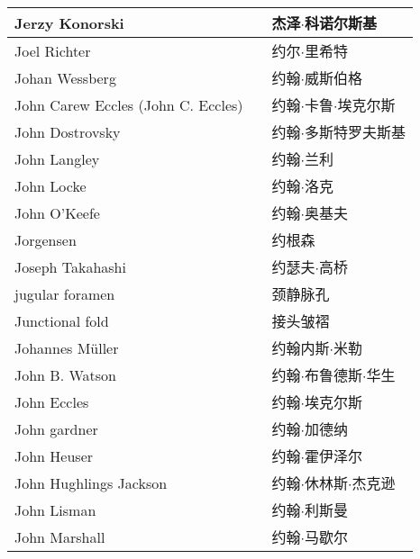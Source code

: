\begin{longtable}{lll}
	\midrule
	Jerzy Konorski   && 杰泽$\cdot$科诺尔斯基  \\
	
	\midrule
	Joel Richter   && 约尔$\cdot$里希特  \\
	
	\midrule
	Johan Wessberg   && 约翰$\cdot$威斯伯格  \\
	
	\midrule
	John Carew Eccles (John C. Eccles)   && 约翰$\cdot$卡鲁$\cdot$埃克尔斯  \\
	
	\midrule
	John Dostrovsky   && 约翰$\cdot$多斯特罗夫斯基  \\
	
	\midrule
	John Langley   && 约翰$\cdot$兰利  \\
	
	\midrule
	John Locke   && 约翰$\cdot$洛克  \\
	
	\midrule
	John O’Keefe   && 约翰$\cdot$奥基夫  \\
	
	\midrule
	Jorgensen   && 约根森  \\
	
	\midrule
	Joseph Takahashi   && 约瑟夫$\cdot$高桥  \\
	
	\midrule
	jugular foramen   && 颈静脉孔  \\
	
	\midrule
	Junctional fold   && 接头皱褶  \\
	
	\midrule
	Johannes Müller   && 约翰内斯$\cdot$米勒  \\
	
	\midrule
	John B. Watson   && 约翰$\cdot$布鲁德斯$\cdot$华生  \\
	
	\midrule
	John Eccles   && 约翰$\cdot$埃克尔斯  \\
	
	\midrule
	John gardner   && 约翰$\cdot$加德纳  \\
	
	\midrule
	John Heuser   && 约翰$\cdot$霍伊泽尔  \\
	
	\midrule
	John Hughlings Jackson   && 约翰$\cdot$休林斯$\cdot$杰克逊  \\
	
	\midrule
	John Lisman   && 约翰$\cdot$利斯曼  \\
	
	\midrule
	John Marshall   && 约翰$\cdot$马歇尔  \\
	

\end{longtable}
